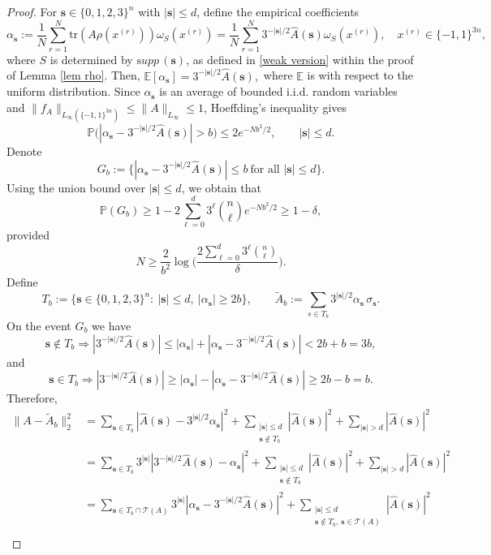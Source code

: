 \documentclass{amsbook}
\theoremstyle{definition}
\theoremstyle{remark}
\numberwithin{section}{chapter}
\numberwithin{equation}{chapter}
\newcommand{\1}{\mathbf{1}}
\newcommand{\s}{\mathbf{s}}
\newcommand{\supp}{{\mathrm supp}\,}
\begin{document}
\begin{proof}
	For $\s\in\{0,1,2,3\}^n$ with $|\s|\le d$, define the empirical coefficients
	\[
	\alpha_{\s}:=
	\frac1N\sum_{r=1}^N \mathrm{tr}(A\rho(x^{(r)}))\omega_{S}(x^{(r)})=\frac1N\sum_{r=1}^N 3^{-|\s|/2}\widehat A(\s)\omega_{S}(x^{(r)}), \quad x^{(r)}\in\{-1,1\}^{3n},
	\]
where \(S\) is determined by  $\supp(\s)$, as defined in \eqref{weak version}  within the proof of Lemma \ref{lem rho}.
	Then, $
	\mathbb E[\alpha_{\s}]=3^{-|\s|/2}\widehat A(\s),$ where  $\mathbb E$ is with respect to the uniform distribution. Since $\alpha_{\s}$ is an average of bounded i.i.d. random variables and \(\|f_A\|_{L_\infty(\{-1,1\}^{3n})}\le \|A\|_{L_\infty}\leq 1\), Hoeffding's inequality gives
	\[
	\mathbb P\Big(
	|\alpha_{\s}-3^{-|\s|/2}\widehat A(\s)|>b
	\Big)\le 2e^{-Nb^2/2},
	\qquad |\s|\le d.
	\]
	Denote
	\[G_b:=\Big\{
	|\alpha_{\s}-3^{-|\s|/2}\widehat A(\s)|\le b
	\ \text{for all }|\s|\le d
	\Big\}.\]
	Using the union bound over $|\s|\leq d$, we obtain that
	\[\mathbb P(G_b)\geq 1-2\sum_{\ell=0}^d 3^\ell\binom{n}{\ell}e^{-Nb^2/2}\geq 1-\delta,\]
	provided
	\[
	N\ge \frac{2}{b^2}\log \Big(\frac{2\sum_{\ell=0}^d 3^\ell\binom{n}{\ell}}{\delta}\Big).
	\]
	Define
	\[
	T_b:=\{\s\in\{0,1,2,3\}^n:\ |\s|\le d,\ |\alpha_{\s}|\ge 2b\},
	\qquad
	\widetilde A_b:=\sum_{s\in T_b}3^{|\s|/2}\alpha_{\s}\,\sigma_{\s}.
	\]
	On the event $G_b$ we have
	\begin{equation}\label{s-noin-Tb}
		\s\notin T_b \Longrightarrow |3^{-|\s|/2}\widehat A(\s)|\le |\alpha_{\s}|+|\alpha_{\s}-3^{-|\s|/2}\widehat A(\s)|<2b+b=3b,
	\end{equation}
	and
	\begin{equation}\label{s-in-Tb}
		\s\in T_b\Longrightarrow |3^{-|\s|/2}\widehat A(\s)|\ge |\alpha_{\s}|-|\alpha_{\s}-3^{-|\s|/2}\widehat A(\s)|\ge 2b-b=b.
	\end{equation}
	Therefore, 
	\begin{align*}
		\|A-\widetilde A_b\|_{2}^2
		&=
		\sum_{\s\in T_b}|\widehat{A}(\s)-3^{|\s|/2}\alpha_{\s}|^2
		+\sum_{\substack{|\s|\le d\\ \s\notin T_b}}|\widehat{A}(\s)|^2
		+\sum_{|\s|>d}|\widehat{A}(\s)|^2 \\
		&= \sum_{\s\in T_b}3^{|\s|}|3^{-|\s|/2}\widehat{A}(\s)-\alpha_{\s}|^2
		+\sum_{\substack{|\s|\le d\\ \s\notin T_b}}|\widehat{A}(\s)|^2
		+\sum_{|\s|>d}|\widehat{A}(\s)|^2 \\
		&=\sum_{\s\in T_b\cap \mathcal T(A)}3^{|\s|}|\alpha_{\s}-3^{-|\s|/2}\widehat{A}(\s)|^2
		+\sum_{\substack{|\s|\le d\\ \s\notin T_b,\ \s\in \mathcal T(A)}}|\widehat{A}(\s)|^2 \\

\end{align*}
\end{proof}
\end{document}
